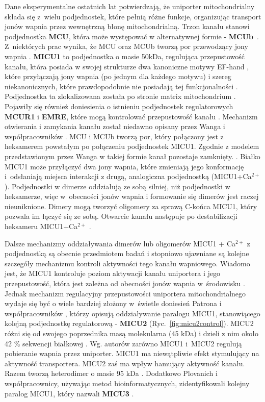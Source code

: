 Dane eksperymentalne ostatnich lat potwierdzają, że uniporter mitochondrialny składa się z~wielu podjednostek, które pełnią różne funkcje, organizując transport jonów wapnia przez wewnętrzną błonę mitochondrialną. Trzon kanału stanowi podjednostka \textbf{MCU}, która może występować w alternatywnej formie - \textbf{MCUb}~\cite{Raffaello2012}. Z~niektórych prac wynika, że MCU oraz MCUb tworzą por przewodzący jony wapnia \cite{Chaudhuri2013}. \textbf{MICU1} to podjednostka o masie 50kDa, regulująca przepustowość kanału, która posiada w swojej strukturze dwa kanoniczne motywy EF-hand \cite{Perocchi2010}, które przyłączają jony wapnia (po jednym dla każdego motywu) i szereg niekanonicznych, które prawdopodobnie nie posiadają tej funkcjonalności \cite{Wang2014}. Podjednostka ta zlokalizowana została po stronie matrix mitochondrium \cite{Hoffman2013}. Pojawiły się również doniesienia o istnieniu podjednostek regulatorowych \textbf{MCUR1} i \textbf{EMRE}, które mogą kontrolować przepustowość kanału \cite{Chaudhuri2013,Sancak2013}. Mechanizm otwierania i zamykania kanału został niedawno opisany przez Wanga i współpracowników \cite{Wang2014}. MCU i MCUb tworzą por, który połączony jest z heksamerem powstałym po połączeniu podjednostek MICU1. Zgodnie z modelem przedstawionym przez Wanga w takiej formie kanał pozostaje zamknięty. \cite{Wang2014}. Białko MICU1 może przyłączyć dwa jony wapnia, które zmieniają jego konformację i~odsłaniają miejsca interakcji z drugą, analogiczna podjednostką (MICU1+Ca$^{2+}$). Podjednostki w dimerze oddziałują ze sobą silniej, niż podjednostki w heksamerze, więc w~obecności jonów wapnia i formowanie się dimerów jest raczej nieuniknione. Dimery mogą tworzyć oligomery za sprawą C-końca MICU1, który pozwala im łączyć się ze sobą. Otwarcie kanału następuje po destabilizacji heksameru MICU1+Ca$^{2+}$ \cite{Wang2014}.

Dalsze mechanizmy oddziaływania dimerów lub oligomerów MICU1 + Ca$^{2+}$ z podjednostką są obecnie przedmiotem badań i stopniowo ujawniane są kolejne szczegóły mechanizmu kontroli aktywności tego kanału wapniowego. Wiadomo jest, że MICU1 kontroluje poziom aktywacji kanału uniportera i jego przepustowość, która jest zależna od obecności jonów wapnia w~środowisku \cite{Csordas2013}. Jednak mechanizm regulacyjny przepustowości uniportera mitochondrialnego wydaje się być o wiele bardziej złożony w~świetle doniesień Patrona i współpracowników \cite{Patron2014}, którzy opisują oddziaływanie paralogu MICU1, stanowiącego kolejną podjednostkę regulatorową - \textbf{MICU2} (Ryc.~\ref{fig:micu2control}). MICU2 różni się od swojego poprzednika masą molekularna (45 kDa) i dzieli z nim około 42 \% sekwencji białkowej \cite{Patron2014}. Wg. autorów zarówno MICU1 i~MICU2 regulują pobieranie wapnia przez uniporter. MICU1 ma niewątpliwie efekt stymulujący na aktywność transportera. MICU2 zaś ma wpływ hamujący aktywność kanału. Razem tworzą heterodimer o masie 95 kDa \cite{Csordas2013,Mallilankaraman2012}. Dodatkowo Plovanich i współpracownicy, używając metod bioinformatycznych, zidentyfikowali kolejny paralog MICU1, który nazwali \textbf{MICU3} \cite{Plovanich2013}.

